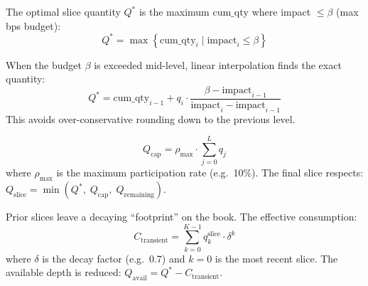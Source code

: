 \documentclass[11pt,a4paper]{article}
\begin{document}
\begin{formulabox}[title={\S5.2 — Slippage Budget Constraint}]
The optimal slice quantity $Q^{*}$ is the maximum $\text{cum\_qty}$ where impact $\leq \beta$ (max bps budget):
\begin{equation}
  Q^{*} = \max\left\{\text{cum\_qty}_i \;\Bigg|\; \text{impact}_i \leq \beta\right\}
\end{equation}
\end{formulabox}

\begin{formulabox}[title={\S5.3 — Level Interpolation}]
When the budget $\beta$ is exceeded mid-level, linear interpolation finds the exact quantity:
\begin{equation}
  Q^{*} = \text{cum\_qty}_{i-1} + q_i \cdot \frac{\beta - \text{impact}_{i-1}}{\text{impact}_i - \text{impact}_{i-1}}
\end{equation}
This avoids over-conservative rounding down to the previous level.
\end{formulabox}

\begin{formulabox}[title={\S5.4 — Participation Rate Cap}]
\begin{equation}
  Q_{\text{cap}} = \rho_{\max} \cdot \sum_{j=0}^{L} q_j
\end{equation}
where $\rho_{\max}$ is the maximum participation rate (e.g.\ 10\%). The final slice respects:
$Q_{\text{slice}} = \min(Q^{*},\; Q_{\text{cap}},\; Q_{\text{remaining}})$.
\end{formulabox}

\begin{formulabox}[title={\S5.5 — Transient Consumption Adjustment}]
Prior slices leave a decaying ``footprint'' on the book. The effective consumption:
\begin{equation}
  C_{\text{transient}} = \sum_{k=0}^{K-1} q_{k}^{\text{slice}} \cdot \delta^k
\end{equation}
where $\delta$ is the decay factor (e.g.\ 0.7) and $k=0$ is the most recent slice.
The available depth is reduced: $Q_{\text{avail}} = Q^{*} - C_{\text{transient}}$.
\end{formulabox}
\end{document}
